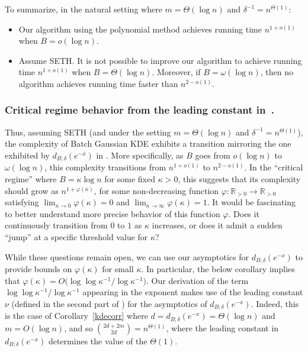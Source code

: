 \documentclass[10pt,a4paper]{article}
\theoremstyle{plain}\newtheorem{theorem}{Theorem}
\theoremstyle{definition}
\begin{document}
To summarize, in the natural setting where $m = \Theta(\log n)$ and $\delta^{-1} = n^{\Theta(1)}$:
\begin{itemize}
    \item Our algorithm using the polynomial method achieves running time $n^{1+o(1)}$ when $B = o(\log n)$. 
    \item Assume SETH. It is not possible to improve our algorithm to achieve running time $n^{1 + o(1)}$ when $B = \Theta (\log n)$. Moreover, if $B = \omega (\log n)$, then no algorithm achieves running time faster than $n^{2 - o(1)}$.
    
\end{itemize}

 \subsubsection{Critical regime behavior from the leading constant in~.}\label{subsec:3} Thus, assuming SETH (and under the setting $m = \Theta (\log n)$ and $\delta^{-1} = n^{\Theta (1)}$), the complexity of Batch Gaussian KDE exhibits a transition mirroring the one exhibited by $d_{B; \delta} (e^{-x})$ in . More specifically, as $B$ goes from $o (\log n)$ to $\omega (\log n)$, this complexity transitions from $n^{1 + o(1)}$ to $n^{2 - o(1)}$. In the ``critical regime'' where $B = \kappa \log n$ for some fixed $\kappa > 0$, this suggests that its complexity should grow as $n^{1 + \varphi (\kappa)}$, for some non-decreasing function $\varphi: \mathbb{R}_{> 0} \rightarrow \mathbb{R}_{> 0}$ satisfying $\lim_{\kappa \rightarrow 0} \varphi (\kappa) = 0$ and $\lim_{\kappa \rightarrow \infty} \varphi(\kappa) = 1$. It would be fascinating to better understand more precise behavior of this function $\varphi$. Does it continuously transition from $0$ to $1$ as $\kappa$ increases, or does it admit a sudden ``jump'' at a specific threshold value for $\kappa$?

While these questions remain open, we can use our asymptotics for $d_{B; \delta} (e^{-x})$ to provide bounds on $\varphi (\kappa)$ for small $\kappa$. In particular, the below corollary implies that $\varphi (\kappa) = O  \big( \log \log \kappa^{-1} / \log \kappa^{-1} \big)$. Our derivation of the term $\log \log \kappa^{-1} / \log \kappa^{-1}$ appearing in the exponent makes use of the leading constant $\nu$ (defined in the second part of ) for the asymptotics of $d_{B; \delta} (e^{-x})$. Indeed, this is the case of Corollary~\ref{kdecorr} where $d = d_{B; \delta} (e^{-x}) = \Theta(\log n)$ and $m = O(\log n)$, and so $\binom{2d+2m}{2d} = n^{\Theta(1)}$, where the leading constant in $d_{B; \delta} (e^{-x})$ determines the value of the $\Theta(1)$. 
\end{document}
